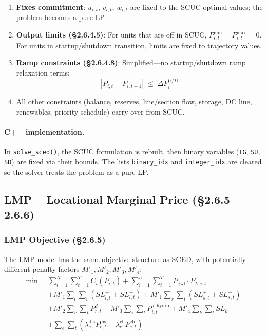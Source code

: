 \begin{enumerate}
  \item \textbf{Fixes commitment}: $u_{i,t}$, $v_{i,t}$, $w_{i,t}$ are fixed
        to the SCUC optimal values; the problem becomes a pure LP.
  \item \textbf{Output limits (§2.6.4.5)}: For units that are off in SCUC,
        $P^{\min}_{i,t} = P^{\max}_{i,t} = 0$. For units in startup/shutdown
        transition, limits are fixed to trajectory values.
  \item \textbf{Ramp constraints (§2.6.4.8)}: Simplified---no startup/shutdown
        ramp relaxation terms:
        \begin{equation}\label{eq:sced-ramp}
          |P_{i,t} - P_{i,t-1}| \;\leq\; \Delta P^{U/D}_i
        \end{equation}
  \item All other constraints (balance, reserves, line/section flow, storage,
        DC line, renewables, priority schedule) carry over from SCUC.
\end{enumerate}

\paragraph{C++ implementation.}
In \texttt{solve\_sced()}, the SCUC formulation is rebuilt, then binary
variables (\texttt{IG}, \texttt{SU}, \texttt{SD}) are fixed via their
bounds. The lists \texttt{binary\_idx} and \texttt{integer\_idx} are
cleared so the solver treats the problem as a pure LP.

\subsection{LMP -- Locational Marginal Price (§2.6.5--2.6.6)}
\label{sec:lmp}

\subsubsection{LMP Objective (§2.6.5)}

The LMP model has the same objective structure as SCED, with potentially
different penalty factors $M'_1, M'_2, M'_3, M'_4$:
\begin{equation}\label{eq:lmp-obj}
\begin{aligned}
\min \;\; & \sum_{i=1}^{N}\sum_{t=1}^{T} C_i(P_{i,t})
  + \sum_{i=1}^{n}\sum_{t=1}^{T} P_{\mathrm{gwf}} \cdot P_{L,i,t} \\
  &+ M'_1 \sum_l \sum_t (SL^{+}_{l,t}+SL^{-}_{l,t})
  + M'_1 \sum_s \sum_t (SL^{+}_{s,t}+SL^{-}_{s,t}) \\
  &+ M'_2 \sum_r \sum_t P^{d}_{r,t}
  + M'_3 \sum_i \sum_t P^{d,\mathrm{hydro}}_{i,t}
  + M'_4 \sum_k \sum_t SL_k \\
  &+ \sum_e \sum_t (\lambda^{\mathrm{dis}}_e P^{\mathrm{dis}}_{e,t}
    + \lambda^{\mathrm{ch}}_e P^{\mathrm{ch}}_{e,t})
\end{aligned}
\end{equation}

